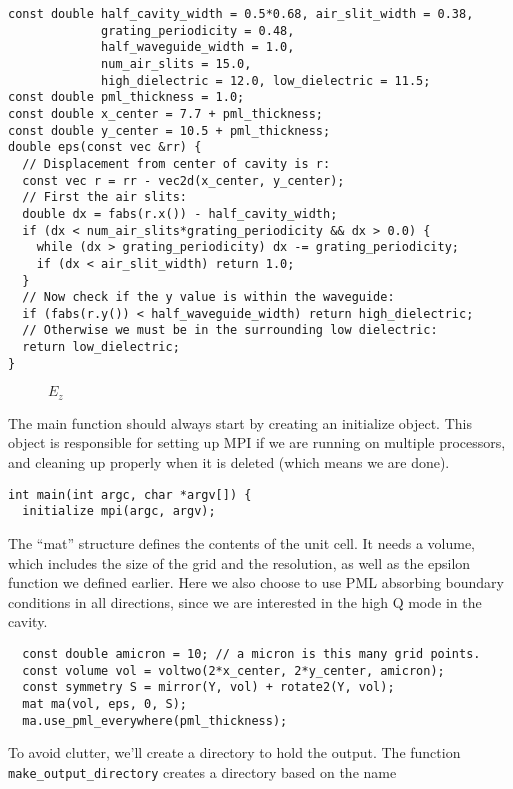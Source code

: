 \begin{verbatim}
const double half_cavity_width = 0.5*0.68, air_slit_width = 0.38,
             grating_periodicity = 0.48,
             half_waveguide_width = 1.0,
             num_air_slits = 15.0,
             high_dielectric = 12.0, low_dielectric = 11.5;
const double pml_thickness = 1.0;
const double x_center = 7.7 + pml_thickness;
const double y_center = 10.5 + pml_thickness;
double eps(const vec &rr) {
  // Displacement from center of cavity is r:
  const vec r = rr - vec2d(x_center, y_center);
  // First the air slits:
  double dx = fabs(r.x()) - half_cavity_width;
  if (dx < num_air_slits*grating_periodicity && dx > 0.0) {
    while (dx > grating_periodicity) dx -= grating_periodicity;
    if (dx < air_slit_width) return 1.0;
  }
  // Now check if the y value is within the waveguide:
  if (fabs(r.y()) < half_waveguide_width) return high_dielectric;
  // Otherwise we must be in the surrounding low dielectric:
  return low_dielectric;
}
\end{verbatim}
\begin{figure}
\label{simple_figure}
\caption{$E_z$}
\begin{center}
\end{center}
\end{figure}
The main function should always start by creating an initialize object.
This object is responsible for setting up MPI if we are running on multiple
processors, and cleaning up properly when it is deleted (which means we are
done).
\begin{verbatim}
int main(int argc, char *argv[]) {
  initialize mpi(argc, argv);
\end{verbatim}
The ``mat'' structure defines the contents of the unit cell.  It needs a
volume, which includes the size of the grid and the resolution, as well as
the epsilon function we defined earlier.  Here we also choose to use PML
absorbing boundary conditions in all directions, since we are interested in
the high Q mode in the cavity.
\begin{verbatim}
  const double amicron = 10; // a micron is this many grid points.
  const volume vol = voltwo(2*x_center, 2*y_center, amicron);
  const symmetry S = mirror(Y, vol) + rotate2(Y, vol);
  mat ma(vol, eps, 0, S);
  ma.use_pml_everywhere(pml_thickness);
\end{verbatim}
To avoid clutter, we'll create a directory to hold the output.  The
function \verb!make_output_directory! creates a directory based on the name
